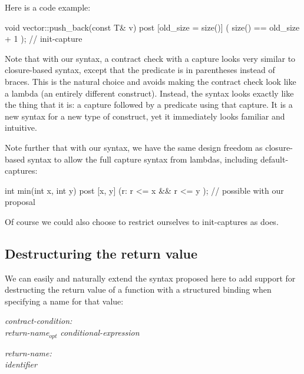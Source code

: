 Here is a code example:

\begin{codeblock}
void vector::push_back(const T& v)
  post [old_size = size()] ( size() == old_size + 1 );  // init-capture
\end{codeblock}

Note that with our syntax, a contract check with a capture looks very similar to closure-based syntax, except that the predicate is in parentheses instead of braces. This is the natural choice and avoids making the contract check look like a lambda (an entirely different construct). Instead, the syntax looks exactly like the thing that it is: a capture followed by a predicate using that capture. It is a new syntax for a new type of construct, yet it immediately looks familiar and intuitive.

Note further that with our syntax, we have the same design freedom as closure-based syntax \cite{P2461R1} to allow the full capture syntax from lambdas, including default-captures:

\begin{codeblock}
int min(int x, int y)
  post [x, y] (r: r <= x && r <= y );   // possible with our proposal
\end{codeblock}

Of course we could also choose to restrict ourselves to init-captures as \cite{P2935R3} does. 


\subsection{Destructuring the return value}
\label{subsec:struct}

We can easily and naturally extend the syntax proposed here to add support for destructing the return value of a function with a structured binding when specifying a name for that value:

\emph{contract-condition:} \\
\phantom{~~~}\tcode{(} \emph{return-name}$_{opt}$ \emph{conditional-expression} \tcode{)}

\emph{return-name:}\\
\phantom{~~~}\emph{identifier} \tcode{:} \\
\phantom{~~~}


